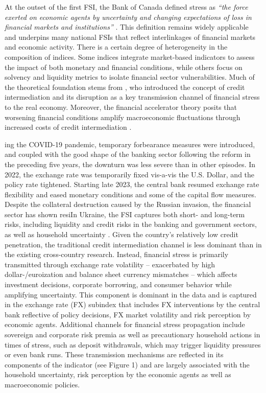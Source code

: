 \documentclass[12pt,preprint,aps,author-year]{revtex4-1}
\begin{document}
At the outset of the first FSI, the Bank of Canada defined stress as \textit{“the force exerted on economic agents by uncertainty and changing expectations of loss in financial markets and institutions” } \citep{illing2003}. This definition remains widely applicable and underpins many national FSIs that reflect interlinkages of financial markets and economic activity. There is a certain degree of heterogeneity in the composition of indices. Some indices integrate market-based indicators to assess the impact of both monetary and financial conditions, while others focus on solvency and liquidity metrics to isolate financial sector vulnerabilities. Much of the theoretical foundation stems from \cite{bernanke1983}, who introduced the concept of credit intermediation and its disruption as a key transmission channel of financial stress to the real economy. Moreover, the financial accelerator theory posits that worsening financial conditions amplify macroeconomic fluctuations through increased costs of credit intermediation \citep{bernankegertlergilchrist1999}.

ing the COVID-19 pandemic, temporary forbearance measures were introduced, and coupled with the good shape of the banking sector following the reform in the preceding five years, the downturn was less severe than in other episodes. In 2022, the exchange rate was temporarily fixed vis-a-vis the U.S. Dollar, and the policy rate tightened. Starting late 2023, the central bank resumed exchange rate flexibility and eased monetary conditions and some of the capital flow measures. Despite the collateral destruction caused by the Russian invasion, the financial sector has shown resiIn Ukraine, the FSI captures both short- and long-term risks, including liquidity and credit risks in the banking and government sectors, as well as household uncertainty \citep{filatov2021}. Given the country’s relatively low credit penetration, the traditional credit intermediation channel is less dominant than in the existing cross-country research. Instead, financial stress is primarily transmitted through exchange rate volatility – exacerbated by high dollar-/euroization and balance sheet currency mismatches – which affects investment decisions, corporate borrowing, and consumer behavior while amplifying uncertainty. This component is dominant in the data and is captured in the exchange rate (FX) subindex that includes FX interventions by the central bank reflective of policy decisions, FX market volatility and risk perception by economic agents. Additional channels for financial stress propagation include sovereign and corporate risk premia as well as precautionary household actions in times of stress, such as deposit withdrawals, which may trigger liquidity pressures or even bank runs. These transmission mechanisms are reflected in its components of the indicator (see Figure 1) and are largely associated with the household uncertainty, risk perception by the economic agents as well as macroeconomic policies.
\end{document}
